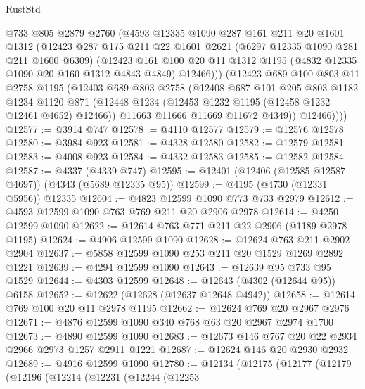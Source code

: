 \begin{lexlean}{RustStd}
\begin{coremodule}
          @733
          @805
          @2879
          @2760
          (@4593
            @12335
            @1090
            @287
            @161
            @211
            @20
            @1601
            @1312
            (@12423
              @287
              @175
              @211
              @22
              @1601
              @2621
              (@6297 @12335 @1090 @281 @211 @1600 @6309)
              (@12423
                @161
                @100
                @20
                @11
                @1312
                @1195
                (@4832 @12335 @1090 @20 @160 @1312 @4843 @4849)
                @12466)))
          (@12423
            @689
            @100
            @803
            @11
            @2758
            @1195
            (@12403
              @689
              @803
              @2758
              (@12408
                @687
                @101
                @205
                @803
                @1182
                @1234
                @1120
                @871
                (@12448 @1234 (@12453 @1232 @1195 (@12458 @1232 @12461 @4652) @12466))
                @11663
                @11666
                @11669
                @11672
                @4349))
            @12466))))
@12577 := @3914 @747
@12578 := @4110 @12577
@12579 := @12576 @12578
@12580 := @3984 @923
@12581 := @4328 @12580
@12582 := @12579 @12581
@12583 := @4008 @923
@12584 := @4332 @12583
@12585 := @12582 @12584
@12587 := @4337 (@4339 @747)
@12595 := @12401 (@12406 (@12585 @12587 @4697)) (@4343 (@5689 @12335 @95))
@12599 := @4195 (@4730 (@12331 @5956)) @12335
@12604 := @4823 @12599 @1090 @773 @733 @2979
@12612 := @4593 @12599 @1090 @763 @769 @211 @20 @2906 @2978
@12614 := @4250 @12599 @1090
@12622 := @12614 @763 @771 @211 @22 @2906 (@1189 @2978 @1195)
@12624 := @4906 @12599 @1090
@12628 := @12624 @763 @211 @2902 @2904
@12637 := @5858 @12599 @1090 @253 @211 @20 @1529 @1269 @2892 @1221
@12639 := @4294 @12599 @1090
@12643 := @12639 @95 @733 @95 @1529
@12644 := @4303 @12599
@12648 := @12643 (@4302 (@12644 @95)) @6158
@12652 := @12622 (@12628 (@12637 @12648 @4942))
@12658 := @12614 @769 @100 @20 @11 @2978 @1195
@12662 := @12624 @769 @20 @2967 @2976
@12671 := @4876 @12599 @1090 @340 @768 @63 @20 @2967 @2974 @1700
@12673 := @4890 @12599 @1090
@12683 := @12673 @146 @767 @20 @22 @2934 @2966 @2973 @1257 @2911 @1221
@12687 := @12624 @146 @20 @2930 @2932
@12689 := @4916 @12599 @1090
@12780 := @12134
    (@12175
      (@12177
        (@12179
          (@12196
            (@12214
              (@12231
                (@12244
                  (@12253

\end{coremodule}
\end{lexlean}
